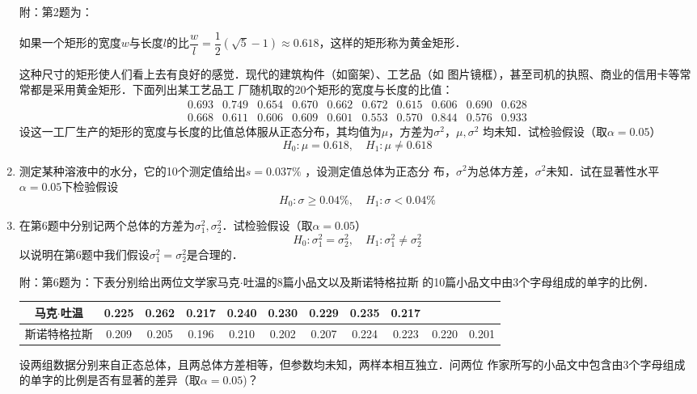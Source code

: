 \begin{enumerate}
    {\kaishu 附：第2题为：    \begin{spacing}{1.5}
        如果一个矩形的宽度$w$与长度$l$的比$\dfrac{w}{l}=\dfrac{1}{2}(\sqrt{5}-1)\approx 0.618$，这样的矩形称为黄金矩形．
        \end{spacing}
        这种尺寸的矩形使人们看上去有良好的感觉．现代的建筑构件（如窗架）、工艺品（如
        图片镜框），甚至司机的执照、商业的信用卡等常常都是采用黄金矩形．下面列出某工艺品工
        厂随机取的20个矩形的宽度与长度的比值：
        $$\begin{array}{cccccccccc}
            0.693 & 0.749 & 0.654 & 0.670 & 0.662  & 0.672 &  0.615 &  0.606 & 0.690 & 0.628\\
            0.668 & 0.611 & 0.606 & 0.609  & 0.601 & 0.553 & 0.570  & 0.844 &  0.576 &  0.933 
        \end{array}$$
        设这一工厂生产的矩形的宽度与长度的比值总体服从正态分布，其均值为$\mu$，方差为$\sigma^2$，$\mu,\sigma^2$
        均未知．试检验假设（取$\alpha=0.05$）
        $$H_0:\mu=0.618,\quad H_1:\mu\neq 0.618$$}




    \item 测定某种溶液中的水分，它的10个测定值给出$s=0.037\%$ ，设测定值总体为正态分
    布，$\sigma^2$为总体方差，$\sigma^2$未知．试在显著性水平$\alpha=0.05$下检验假设
    $$H_0:\sigma\geq 0.04\%,\quad H_1:\sigma<0.04\%$$




    \item 在第6题中分别记两个总体的方差为$\sigma_1^2,\sigma_2^2$．试检验假设（取$\alpha=0.05$）
    $$H_0:\sigma_1^2=\sigma_2^2, \quad H_1:\sigma_1^2\neq \sigma^2_2$$
    以说明在第6题中我们假设$\sigma_1^2=\sigma_2^2$是合理的．
    
    {\kaishu 附：第6题为：下表分别给出两位文学家马克$\cdot$吐温的8篇小品文以及斯诺特格拉斯
    的10篇小品文中由3个字母组成的单字的比例．
    \renewcommand{\arraystretch}{1.3}
    \begin{table}[H]\centering
        \small
        \begin{tabular}{c|cccccccccc}
        马克$\cdot$吐温 & 0.225 & 0.262 & 0.217 & 0.240 & 0.230 & 0.229 & 0.235 & 0.217 &  &  \\ \hline
        斯诺特格拉斯 & 0.209 & 0.205 & 0.196 & 0.210 & 0.202 & 0.207 & 0.224 & 0.223 & 0.220 & 0.201
    \end{tabular}
    \end{table}
    \renewcommand{\arraystretch}{1.0}
    设两组数据分别来自正态总体，且两总体方差相等，但参数均未知，两样本相互独立．问两位
    作家所写的小品文中包含由3个字母组成的单字的比例是否有显著的差异（取$\alpha=0.05$)？}





\end{enumerate}
